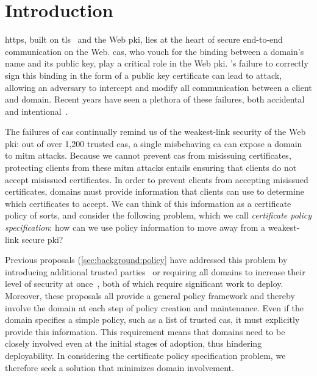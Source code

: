 \section{Introduction}
\label{sec:intro}


\acs{https}, built on \ac{tls}~\cite{rfc5246} and the Web \ac{pki}, lies at the
heart of secure end-to-end communication on the Web. \Acp{ca}, who vouch for the
binding between a domain's name and its public key, play a critical role in the
Web \ac{pki}. 's failure to correctly sign this binding in the form of a
public key certificate can lead to  attack, allowing an adversary to
intercept and modify all communication between a client and domain. Recent years
have seen a plethora of these failures, both
accidental~\cite{sleevi2015sustaining} and
intentional~\cite{valsorda2015komodia}.

The failures of \acp{ca} continually remind us of the weakest-link security of
the Web \ac{pki}: out of over 1,200 trusted \acp{ca}, a single misbehaving
\ac{ca} can expose a domain to \ac{mitm} attacks. Because we cannot prevent
\acp{ca} from misissuing certificates, protecting clients from these \ac{mitm}
attacks entails ensuring that clients do not accept misissued certificates. In
order to prevent clients from accepting misissued certificates, domains must
provide information that clients can use to determine which certificates to
accept. We can think of this information as a certificate policy of sorts, and
consider the following problem, which we call \emph{certificate policy
specification}: how can we use policy information to move away from a
weakest-link secure \ac{pki}?

Previous proposals (\autoref{sec:background:policy} have addressed this problem
by introducing additional trusted parties~\cite{kim2013accountable} or requiring
all domains to increase their level of security at once~\cite{basin2014arpki},
both of which require significant work to deploy. Moreover, these proposals all
provide a general policy framework and thereby involve the domain at each step
of policy creation and maintenance. Even if the domain specifies a simple
policy, such as a list of trusted \acp{ca}, it must explicitly provide this
information. This requirement means that domains need to be closely involved
even at the initial stages of adoption, thus hindering deployability. In
considering the certificate policy specification problem, we therefore seek a
solution that minimizes domain involvement.

